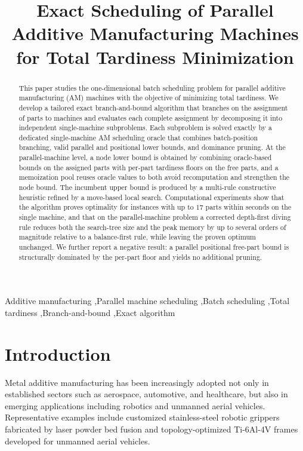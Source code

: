 \documentclass[review,3p,times,authoryear]{elsarticle}
\begin{document}
\begin{frontmatter}

\title{Exact Scheduling of Parallel Additive Manufacturing Machines for Total Tardiness Minimization}





\begin{abstract}
	This paper studies the one-dimensional batch scheduling problem for parallel
	additive manufacturing (AM) machines with the objective of minimizing total
	tardiness. We develop a tailored exact branch-and-bound algorithm that branches
	on the assignment of parts to machines and evaluates each complete assignment by
	decomposing it into independent single-machine subproblems. Each subproblem is
	solved exactly by a dedicated single-machine AM scheduling oracle that combines
	batch-position branching, valid parallel and positional lower bounds, and
	dominance pruning. At the parallel-machine level, a node lower bound is obtained
	by combining oracle-based bounds on the assigned parts with per-part tardiness
	floors on the free parts, and a memoization pool reuses oracle values to both
	avoid recomputation and strengthen the node bound. The incumbent upper bound is
	produced by a multi-rule constructive heuristic refined by a move-based local
	search. Computational experiments show that the algorithm proves optimality for
	instances with up to $17$ parts within seconds on the single machine, and that
	on the parallel-machine problem a corrected depth-first diving rule reduces both
	the search-tree size and the peak memory by up to several orders of magnitude
	relative to a balance-first rule, while leaving the proven optimum unchanged. We further report a negative
	result: a parallel positional free-part bound is structurally dominated by the
	per-part floor and yields no additional pruning.
\end{abstract}

\begin{keyword}
Additive manufacturing \sep Parallel machine scheduling \sep Batch scheduling \sep Total tardiness \sep Branch-and-bound \sep Exact algorithm
\end{keyword}

\end{frontmatter}


\section{Introduction}
Metal additive manufacturing has been increasingly adopted not only in established sectors such as aerospace, automotive, and healthcare, but also in emerging applications including robotics and unmanned aerial vehicles. Representative examples include customized stainless-steel robotic grippers fabricated by laser powder bed fusion and topology-optimized Ti-6Al-4V frames developed for unmanned aerial vehicles.
\end{document}

